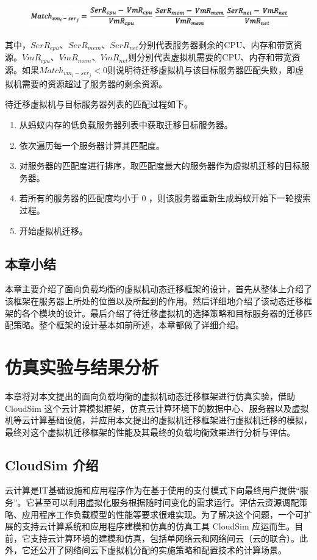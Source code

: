 \begin{figure}[htbp]
  \centering
  \includegraphics[width=0.8\linewidth]{./Figure/IMG_Chap3_14.png}
\end{figure}

其中，$ SerR_{cpu} $、$ SerR_{mem} $、$ SerR_{net} $分别代表服务器剩余的CPU、内存和带宽资源。$ VmR_{cpu} $、$ VmR_{mem} $、$ VmR_{net} $则分别代表虚拟机需要的CPU、内存和带宽资源。如果$ Match_{vm_i-ser_j} < 0 $则说明待迁移虚拟机与该目标服务器匹配失败，即虚拟机需要的资源超过了服务器的剩余资源。

待迁移虚拟机与目标服务器列表的匹配过程如下。
\begin{enumerate}[(1)]
    \item 从蚂蚁内存的低负载服务器列表中获取迁移目标服务器。
    \item 依次遍历每一个服务器计算其匹配度。
    \item 对服务器的匹配度进行排序，取匹配度最大的服务器作为虚拟机迁移的目标服务器。
    \item 若所有的服务器的匹配度均小于 0 ，则该服务器重新生成蚂蚁开始下一轮搜索过程。
    \item 开始虚拟机迁移。
\end{enumerate}

\section{本章小结}
本章主要介绍了面向负载均衡的虚拟机动态迁移框架的设计，首先从整体上介绍了该框架在服务器上所处的位置以及所起到的作用。然后详细地介绍了该动态迁移框架的各个模块的设计。最后介绍了待迁移虚拟机的选择策略和目标服务器的迁移匹配策略。整个框架的设计基本如前所述，本章都做了详细介绍。

\chapter{仿真实验与结果分析}
本章将对本文提出的面向负载均衡的虚拟机动态迁移框架进行仿真实验，借助 CloudSim 这个云计算模拟框架，仿真云计算环境下的数据中心、服务器以及虚拟机等云计算基础设施，并应用本文提出的虚拟机迁移框架进行虚拟机迁移的模拟，最终对这个虚拟机迁移框架的性能及其最终的负载均衡效果进行分析与评估。

\section{CloudSim 介绍}
云计算是IT基础设施和应用程序作为在基于使用的支付模式下向最终用户提供“服务”。它甚至可以利用虚拟化服务根据随时间变化的需求运行。评估云资源调配策略、应用程序工作负载模型的性能等要求很难实现。为了解决这个问题，一个可扩展的支持云计算系统和应用程序建模和仿真的仿真工具 CloudSim 应运而生\cite{Atanasov}。目前，它支持云计算环境的建模和仿真，包括单网络云和网络间云（云的联合）。此外，它还公开了网络间云下虚拟机分配的实施策略和配置技术的计算场景。

